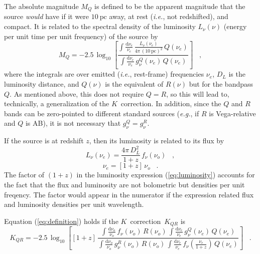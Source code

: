 \documentclass[preprint]{aastex}
\newcommand{\kcorrection}{$K$~correction}
\newcommand{\nuobs}{\nu_o}
\newcommand{\nuemit}{\nu_e}
\newcommand{\latin}[1]{\textsl{#1}}
\providecommand{\ie}{\latin{i.e.}}
\providecommand{\eg}{\latin{e.g.}}
\begin{document}
The absolute magnitude $M_Q$ is defined to be the apparent magnitude
that the source \emph{would} have if it were $10~\mathrm{pc}$ away, at
rest (\ie, not redshifted), and compact.  It is related to the
spectral density of the luminosity $L_{\nu}(\nu)$ (energy per unit
time per unit frequency) of the source by
\begin{equation}
M_Q = -2.5\,\log_{10}\left[
  \frac{\displaystyle
          \int\frac{\mathrm{d}\nuemit}{\nuemit}\,
              \frac{L_{\nu}(\nuemit)}{4\pi\,(10~\mathrm{pc})^2}\,Q(\nuemit)}
       {\displaystyle
          \int\frac{\mathrm{d}\nuemit}{\nuemit}\,g^Q_{\nu}(\nuemit)\,Q(\nuemit)}
\right] \;\;\;,
\end{equation}
where the integrals are over emitted (\ie, rest-frame) frequencies
$\nuemit$, $D_L$ is the luminosity distance, and $Q(\nu)$ is the
equivalent of $R(\nu)$ but for the bandpass $Q$.  As mentioned above,
this does not require $Q=R$, so this will lead to, technically, a
generalization of the \kcorrection.  In addition, since the $Q$ and
$R$ bands can be zero-pointed to different standard sources (\eg, if
$R$ is Vega-relative and $Q$ is AB), it is not necessary that
$g^Q_{\nu}=g^R_{\nu}$.

If the source is at redshift $z$, then its luminosity is related to
its flux by
\begin{equation}
\label{eq:luminosity}
L_{\nu}(\nuemit) = \frac{4\pi\,D_L^2}{1+z}\,f_{\nu}(\nuobs) \;\;\;,
\end{equation}
\begin{equation}
\nuemit = [1+z]\,\nuobs \;\;\;.
\end{equation}
The factor of $(1+z)$ in the luminosity expression
(\ref{eq:luminosity}) accounts for the fact that the flux and
luminosity are not bolometric but densities per unit freqency.  The
factor would appear in the numerator if the expression related flux
and luminosity densities per unit wavelength.

Equation (\ref{eq:definition}) holds if the \kcorrection\ $K_{QR}$ is
\begin{equation}
\label{eq:kcorrection}
K_{QR} = -2.5\,\log_{10}\left[[1+z]\,
  \frac{\displaystyle
          \int\frac{\mathrm{d}\nuobs}{\nuobs}\,f_{\nu}(\nuobs)\,R(\nuobs)\,
          \int\frac{\mathrm{d}\nuemit}{\nuemit}\,g^Q_{\nu}(\nuemit)\,Q(\nuemit)}
       {\displaystyle
          \int\frac{\mathrm{d}\nuobs}{\nuobs}\,g^R_{\nu}(\nuobs)\,R(\nuobs)\,
          \int\frac{\mathrm{d}\nuemit}{\nuemit}\,
            f_{\nu}\!\left(\frac{\nuemit}{1+z}\right)\,Q(\nuemit)}
\right] \;\;\;.
\end{equation}
\end{document}
